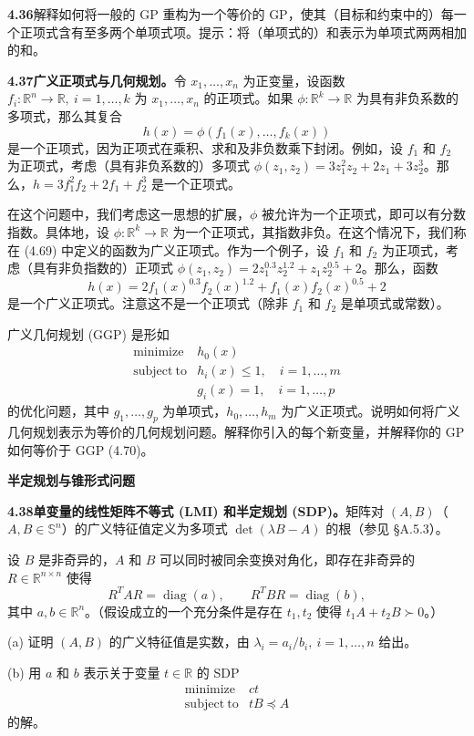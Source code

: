 \documentclass[UTF8,12pt,a4paper,fontset=fandol]{ctexart}
\begin{document}
\noindent\textbf{4.36}\quad 解释如何将一般的 GP 重构为一个等价的 GP，使其（目标和约束中的）每一个正项式含有至多两个单项式项。提示：将（单项式的）和表示为单项式两两相加的和。

\noindent\textbf{4.37\quad 广义正项式与几何规划。}\quad 令 $x_1,\ldots,x_n$ 为正变量，设函数 $f_i:\mathbb{R}^n\to\mathbb{R},\ i=1,\ldots,k$ 为 $x_1,\ldots,x_n$ 的正项式。如果 $\phi:\mathbb{R}^k\to\mathbb{R}$ 为具有非负系数的多项式，那么其复合
\[
h(x)=\phi(f_1(x),\ldots,f_k(x))
\tag{4.69}
\]
是一个正项式，因为正项式在乘积、求和及非负数乘下封闭。例如，设 $f_1$ 和 $f_2$ 为正项式，考虑（具有非负系数的）多项式 $\phi(z_1,z_2)=3z_1^2z_2+2z_1+3z_2^3$。那么，$h=3f_1^2f_2+2f_1+f_2^3$ 是一个正项式。

在这个问题中，我们考虑这一思想的扩展，$\phi$ 被允许为一个正项式，即可以有分数指数。具体地，设 $\phi:\mathbb{R}^k\to\mathbb{R}$ 为一个正项式，其指数非负。在这个情况下，我们称在 (4.69) 中定义的函数为广义正项式。作为一个例子，设 $f_1$ 和 $f_2$ 为正项式，考虑（具有非负指数的）正项式 $\phi(z_1,z_2)=2z_1^{0.3}z_2^{1.2}+z_1z_2^{0.5}+2$。那么，函数
\[
h(x)=2f_1(x)^{0.3}f_2(x)^{1.2}+f_1(x)f_2(x)^{0.5}+2
\]
是一个广义正项式。注意这不是一个正项式（除非 $f_1$ 和 $f_2$ 是单项式或常数）。

广义几何规划 (GGP) 是形如
\[
\begin{array}{ll}
\mathop{\mathrm{minimize}} & h_0(x)\\
\mathrm{subject\ to} & h_i(x)\leq1,\quad i=1,\ldots,m\\
& g_i(x)=1,\quad i=1,\ldots,p
\end{array}
\tag{4.70}
\]
的优化问题，其中 $g_1,\ldots,g_p$ 为单项式，$h_0,\ldots,h_m$ 为广义正项式。说明如何将广义几何规划表示为等价的几何规划问题。解释你引入的每个新变量，并解释你的 GP 如何等价于 GGP (4.70)。

\noindent\textbf{半定规划与锥形式问题}

\noindent\textbf{4.38\quad 单变量的线性矩阵不等式 (LMI) 和半定规划 (SDP)。}\quad 矩阵对 $(A,B)$（$A,B\in\mathbb{S}^n$）的广义特征值定义为多项式 $\det(\lambda B-A)$ 的根（参见 \S A.5.3）。

设 $B$ 是非奇异的，$A$ 和 $B$ 可以同时被同余变换对角化，即存在非奇异的 $R\in\mathbb{R}^{n\times n}$ 使得
\[
R^TAR=\operatorname{diag}(a),\qquad R^TBR=\operatorname{diag}(b),
\]
其中 $a,b\in\mathbb{R}^n$。（假设成立的一个充分条件是存在 $t_1,t_2$ 使得 $t_1A+t_2B\succ0$。）

(a) 证明 $(A,B)$ 的广义特征值是实数，由 $\lambda_i=a_i/b_i,\ i=1,\ldots,n$ 给出。

(b) 用 $a$ 和 $b$ 表示关于变量 $t\in\mathbb{R}$ 的 SDP
\[
\begin{array}{ll}
\mathop{\mathrm{minimize}} & ct\\
\mathrm{subject\ to} & tB\preceq A
\end{array}
\]
的解。
\end{document}
